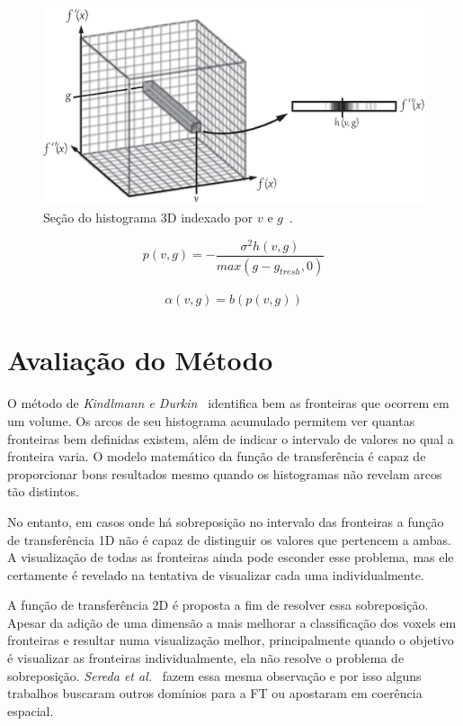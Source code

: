 \begin{figure}[h]
	\centering
	\includegraphics[width=1\textwidth]{images/g_hvg}
	\caption{Seção do histograma 3D indexado por $ v $ e $ g $~\cite{gordonms}.}
	\label{fig:g_hvg}
\end{figure}
    
\begin{equation} \label{eq:pvg}
	p(v,g) = -\frac{\sigma^{2}h(v,g)}{max(g - g_{tresh}, 0)}
\end{equation} \\

\begin{equation} \label{eq:alphavg}
	\alpha(v, g) = b(p(v, g))
\end{equation}

\section{Avaliação do Método}
\label{gordon.aval}
	O método de \textit{Kindlmann e Durkin}~\cite{gordon} identifica bem as fronteiras que ocorrem em um volume. Os arcos de seu histograma acumulado permitem ver quantas fronteiras bem definidas existem, além de indicar o intervalo de valores no qual a fronteira varia. O modelo matemático da função de transferência é capaz de proporcionar bons resultados mesmo quando os histogramas não revelam arcos tão distintos.
	
	No entanto, em casos onde há sobreposição no intervalo das fronteiras a função de transferência 1D não é capaz de distinguir os valores que pertencem a ambas. A visualização de todas as fronteiras ainda pode esconder esse problema, mas ele certamente é revelado na tentativa de visualizar cada uma individualmente.
	
	A função de transferência 2D é proposta a fim de resolver essa sobreposição. Apesar da adição de uma dimensão a mais melhorar a classificação dos voxels em fronteiras e resultar numa visualização melhor, principalmente quando o objetivo é visualizar as fronteiras individualmente, ela não resolve o problema de sobreposição. \textit{Sereda et al.}~\cite{sereda1} fazem essa mesma observação e por isso alguns trabalhos buscaram outros domínios para a FT ou apostaram em coerência espacial.
	
